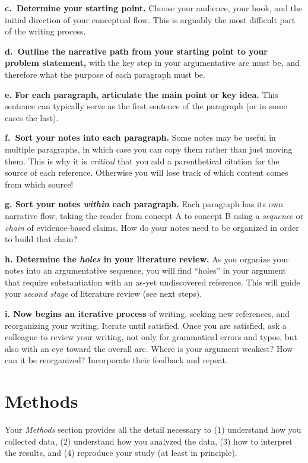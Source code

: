 \documentclass[
]{book}
\begin{document}
\textbf{c.~Determine your starting point.} Choose your audience, your hook, and the initial direction of your conceptual flow. This is arguably the most difficult part of the writing process.

\textbf{d.~Outline the narrative path from your starting point to your problem statement,} with the key step in your argumentative arc must be, and therefore what the purpose of each paragraph must be.

\textbf{e. For each paragraph, articulate the main point or key idea.} This sentence can typically serve as the first sentence of the paragraph (or in some cases the last).

\textbf{f.~Sort your notes into each paragraph.} Some notes may be useful in multiple paragraphs, in which case you can copy them rather than just moving them. This is why it is \emph{critical} that you add a parenthetical citation for the source of each reference. Otherwise you will lose track of which content comes from which source!

\textbf{g. Sort your notes \emph{within} each paragraph.} Each paragraph has its own narrative flow, taking the reader from concept A to concept B using a \emph{sequence} or \emph{chain} of evidence-based claims. How do your notes need to be organized in order to build that chain?

\textbf{h. Determine the \emph{holes} in your literature review.} As you organize your notes into an argumentative sequence, you will find ``holes'' in your argument that require substantiation with an as-yet undiscovered reference. This will guide your \emph{second stage} of literature review (see next steps).

\textbf{i. Now begins an iterative process} of writing, seeking new references, and reorganizing your writing. Iterate until satisfied. Once you are satisfied, ask a colleague to review your writing, not only for grammatical errors and typos, but also with an eye toward the overall arc. Where is your argument weakest? How can it be reorganized? Incorporate their feedback and repeat.

\hypertarget{methods}{%
\section*{Methods}\label{methods}}

Your \emph{Methods} section provides all the detail necessary to (1) understand how you collected data, (2) understand how you analyzed the data, (3) how to interpret the results, and (4) reproduce your study (at least in principle).
\end{document}
